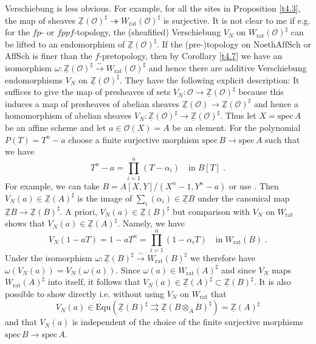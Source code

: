 \documentclass[12pt,leqno]{article}
\newcommand{\Z}{{\mathbb{Z}}}
\newcommand{\uZ}{\underline{\Z}}
\newcommand{\NAS}{\mathrm{NoethAffSch}}
\newcommand{\AS}{\mathrm{AffSch}}
\newcommand{\spec}{\mathrm{spec}\,}
\newcommand{\rat}{\mathrm{rat}}
\newcommand{\Oh}{{\mathcal O}}
\newcommand{\silo}{\stackrel{\sim}{\rightarrow}}
\begin{document}
Verschiebung is less obvious. For example, for all the sites in Proposition \ref{t4.3}, the map of sheaves $\uZ (\Oh)^{\sharp} \twoheadrightarrow W_{\rat} (\Oh)^{\sharp}$ is surjective. It is not clear to me if e.g. for the $fp$- or $fppf$-topology, the (sheafified) Verschiebung $V_N$ on $W_{\rat} (\Oh)^{\sharp}$ can be lifted to an endomorphism of $\uZ (\Oh)^{\sharp}$. If the (pre-)topology on $\NAS$ or $\AS$ is finer than the $f$-pretopology, then by Corollary \ref{t4.7} we have an isomorphism $\omega : \uZ (\Oh)^{\sharp} \silo W_{\rat} (\Oh)^{\sharp}$ and hence there are additive Verschiebung endomorphisms $V_N$ on $\uZ (\Oh)^{\sharp}$. They have the following explicit description: It suffices to give the map of presheaves of sets $V_N : \Oh \to \uZ (\Oh)^{\sharp}$ because this induces a map of presheaves of abelian sheaves $\uZ (\Oh) \to \uZ (\Oh)^{\sharp}$ and hence a homomorphism of abelian sheaves $V_N : \uZ (\Oh)^{\sharp} \to \uZ (\Oh)^{\sharp}$. Thus let $X = \spec A$ be an affine scheme and let $a \in \Oh (X) = A$ be an element. For the polynomial $P (T) = T^n-a$ choose a finite surjective morphism $\spec B \to \spec A$ such that we have
\[
T^n - a = \prod^n_{i=1} (T - \alpha_i) \quad \text{in} \; B [T] \; .
\]
For example, we can take $B = A [X,Y] / (X^n - 1 , Y^n- a)$ or use \cite[Lemma 10.136.14]{stacks}. Then $V_N (a) \in \uZ (A)^{\sharp}$ is the image of $\sum_i (\alpha_i) \in \uZ B$ under the canonical map $\uZ B \to \uZ (B)^{\sharp}$. A priori, $V_N (a) \in \uZ (B)^{\sharp}$ but comparison with $V_N$ on $W_{\rat}$ shows that $V_N (a) \in \uZ (A)^{\sharp}$. Namely, we have
\[
V_N (1 - aT) = 1 - aT^n = \prod^n_{i=1} (1 - \alpha_i T) \quad \text{in} \; W_{\rat} (B) \; .
\]
Under the isomorphism $\omega : \uZ (B)^{\sharp} \silo W_{\rat} (B)^{\sharp}$ we therefore have $\omega (V_N (a)) = V_N (\omega (a))$. Since $\omega (a) \in W_{\rat} (A)^{\sharp}$ and since $V_N$ maps $W_{\rat} (A)^{\sharp}$ into itself, it follows that $V_N (a) \in \uZ (A)^{\sharp} \subset \uZ (B)^{\sharp}$. It is also possible to show directly i.e. without using $V_N$ on $W_{\rat}$ that
\[
V_N (a) \in \mathrm{Equ} (\uZ (B)^{\sharp} \rightrightarrows \uZ (B \otimes_A B)^{\sharp}) = \uZ (A)^{\sharp}
\]
and that $V_N (a)$ is independent of the choice of the finite surjective morphisms $\spec B \to \spec A$. 
\end{document}
